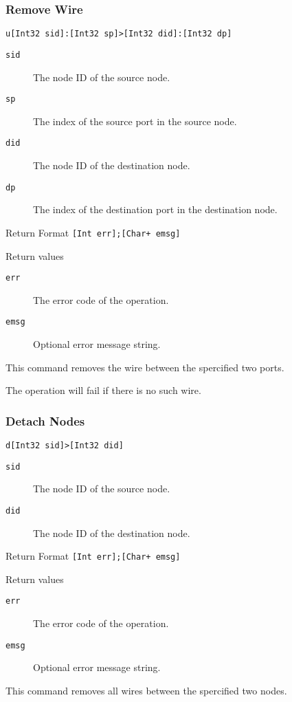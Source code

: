 \documentclass{report}
\newcommand{\inlinecode}[1]{\begin{mdframed}[backgroundcolor=black!10]#1\end{mdframed}}
\begin{document}
\subsubsection{Remove Wire}
\inlinecode{
\begin{description}\sloppy
\item[Command Format] \lstinline{u[Int32 sid]:[Int32 sp]>[Int32 did]:[Int32 dp]}
\item[Command Arguments]\hfill
  \begin{description}
  \item[\texttt{sid}] The node ID of the source node.
  \item[\texttt{sp}] The index of the source port in the source node.
  \item[\texttt{did}] The node ID of the destination node.
  \item[\texttt{dp}] The index of the destination port in the destination node.
  \end{description}
\item[Return Format] \lstinline|[Int err];[Char+ emsg]|
\item[Return values]\hfill
  \begin{description}
  \item[\texttt{err}] The error code of the operation.
  \item[\texttt{emsg}] Optional error message string.
  \end{description}
\end{description}}\par
This command removes the wire between the spercified two ports.\par
The operation will fail if there is no such wire.
\subsubsection{Detach Nodes}
\inlinecode{
\begin{description}\sloppy
\item[Command Format] \lstinline{d[Int32 sid]>[Int32 did]}
\item[Command Arguments]\hfill
  \begin{description}
  \item[\texttt{sid}] The node ID of the source node.
  \item[\texttt{did}] The node ID of the destination node.
  \end{description}
\item[Return Format] \lstinline|[Int err];[Char+ emsg]|
\item[Return values]\hfill
  \begin{description}
  \item[\texttt{err}] The error code of the operation.
  \item[\texttt{emsg}] Optional error message string.
  \end{description}
\end{description}}\par
This command removes all wires between the spercified two nodes.
\end{document}
